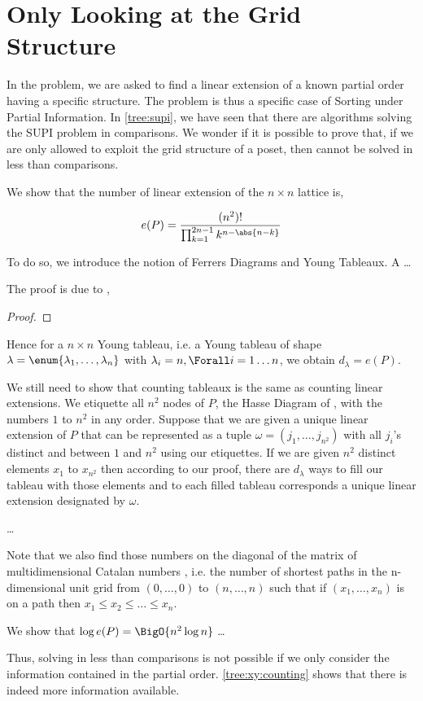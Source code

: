 \section{Only Looking at the Grid Structure}
\label{tree:xy:grid}

In the \XY problem, we are asked to find a linear extension of a known partial
order having a specific structure. The \XY problem is thus a specific case of
Sorting under Partial Information. In \ref{tree:supi}, we have seen that there
are algorithms solving the SUPI problem in  comparisons. We
wonder if it is possible to prove that, if we are only allowed to exploit the
grid structure of a \XY poset, then \XY cannot be solved in less than  comparisons.

We show that the number of linear extension of the $n \times n$ lattice is,

$$ e(P) = \frac{(n^2)!}{\prod_{k=1}^{2n-1} k^{n - \abs{n-k}}} $$

To do so, we introduce the notion of Ferrers Diagrams and Young Tableaux. A
\dots

The proof is due to \citet*{greene:1979},

\begin{proof}

\end{proof}

Hence for a $n \times n$ Young tableau, i.e. a Young tableau of shape $\lambda
= \enum{ \lambda_1 , \ldots , \lambda_n }$ with $\lambda_i = n, \Forall i = 1
\ldots n$, we obtain $d_{\lambda} = e(P)$.

We still need to show that counting tableaux is the same as counting linear
extensions. We etiquette all $n^2$ nodes of $P$, the Hasse Diagram of \XY, with the
numbers $1$ to $n^2$ in any order. Suppose that we are given a unique linear
extension of $P$ that can be represented as a tuple $\omega = ( j_1 , \ldots ,
j_{n^2})$ with all $j_i$'s distinct and between $1$ and $n^2$ using our
etiquettes. If we are given $n^2$ distinct elements $x_1$ to $x_{n^2}$ then
according to our proof, there are $d_{\lambda}$ ways to fill our tableau with
those elements and to each filled tableau corresponds a unique linear
extension designated by $\omega$.

\dots

Note that we also find those numbers on the diagonal of the matrix of
multidimensional Catalan numbers \cite{OEIS:A060854}, i.e. the number of
shortest paths in the n-dimensional unit grid from $(0,\ldots,0)$ to
$(n,\ldots,n)$ such that if $(x_1,\ldots,x_n)$ is on a path then $x_1 \le x_2
\le \ldots \le x_n$.

We show that $\log e(P) = \BigO{n^2 \log n}$ \dots

Thus, solving \XY in less than  comparisons is not possible
if we only consider the information contained in the partial order.
\ref{tree:xy:counting} shows that there is indeed more information available.

